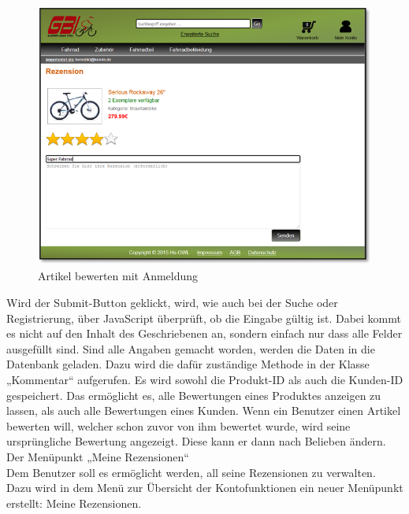\begin{figure}[H]
\begin{center}
\includegraphics[width=12cm]{Bilder/Michael_Abbildung12-ArtikelBewertenMitAnmeldung.png}
\end{center}
\caption{Artikel bewerten mit Anmeldung}
\end{figure}

\newpage
Wird der Submit-Button geklickt, wird, wie auch bei der Suche oder Registrierung, über JavaScript überprüft, ob die Eingabe gültig ist. Dabei kommt es nicht auf den Inhalt des Geschriebenen an, sondern einfach nur dass alle Felder ausgefüllt sind. Sind alle Angaben gemacht worden, werden die Daten in die Datenbank geladen. Dazu wird die dafür zuständige Methode in der Klasse „Kommentar“ aufgerufen. Es wird sowohl die Produkt-ID als auch die Kunden-ID gespeichert. Das ermöglicht es, alle Bewertungen eines Produktes anzeigen zu lassen, als auch alle Bewertungen eines Kunden. Wenn ein Benutzer einen Artikel bewerten will, welcher schon zuvor von ihm bewertet wurde, wird seine ursprüngliche Bewertung angezeigt. Diese kann er dann nach Belieben ändern.
\\
Der Menüpunkt „Meine Rezensionen“
\\
Dem Benutzer soll es ermöglicht werden, all seine Rezensionen zu verwalten. Dazu wird in dem Menü zur Übersicht der Kontofunktionen ein neuer Menüpunkt erstellt: Meine Rezensionen. 


